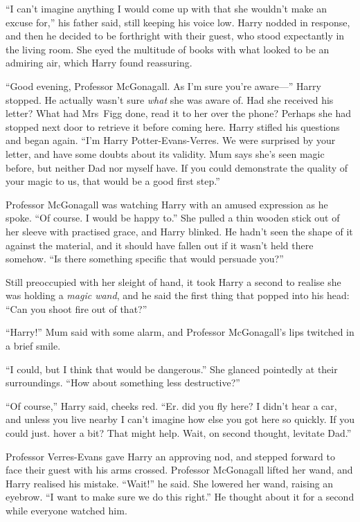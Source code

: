 “I can’t imagine anything I would come up with that she
wouldn’t make an excuse for,” his father said, still keeping
his voice low. Harry nodded in response, and then he decided to be forthright
with their guest, who stood expectantly in the living room.
She eyed the multitude of books with what looked to be
an admiring air, which Harry found reassuring.

“Good evening, Professor McGonagall. As I’m sure you’re
aware—” Harry stopped. He actually wasn’t sure \emph{what} she
was aware of. Had she received his letter? What had Mrs~Figg done,
read it to her over the phone? Perhaps she
had stopped next door to retrieve it before coming here.
Harry stifled his questions and began again. “I’m Harry
Potter-Evans-Verres. We were surprised by your letter, and
have some doubts about its validity. Mum says she’s seen
magic before, but neither Dad nor myself have. If you
could demonstrate the quality of your magic to us, that
would be a good first step.”

Professor McGonagall was watching Harry with an amused
expression as he spoke. “Of course. I would be happy to.”
She pulled a thin wooden stick out of her sleeve with
practised grace, and Harry blinked. He hadn’t seen the
shape of it against the material, and it should have fallen
out if it wasn’t held there somehow. “Is there something
specific that would persuade you?”

Still preoccupied with her sleight of hand, it took Harry a
second to realise she was holding a \emph{magic wand}, and he
said the first thing that popped into his head: “Can you
shoot fire out of that?”

“Harry!” Mum said with some alarm, and Professor
McGonagall’s lips twitched in a brief smile.

“I could, but I think that would be dangerous.” She
glanced pointedly at their surroundings. “How about
something less destructive?”

“Of course,” Harry said, cheeks red. “Er. did you fly
here? I didn’t hear a car, and unless you live nearby I
can’t imagine how else you got here so quickly. If you
could just. hover a bit? That might help. Wait, on second
thought, levitate Dad.”

Professor Verres-Evans gave Harry an approving nod, and
stepped forward to face their guest with his arms crossed.
Professor McGonagall lifted her wand, and Harry realised
his mistake. “Wait!” he said. She lowered her wand, raising
an eyebrow. “I want to make sure we do this right.” He
thought about it for a second while everyone watched him.

